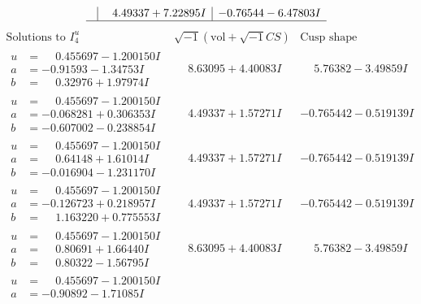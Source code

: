 \documentclass[1p]{elsarticle_modified}
\theoremstyle{definition}
\newcommand{\I}{\sqrt{-1}}
\begin{document}
$$\begin{array}{c|c|c}
 & \phantom{-}4.49337 + 7.22895 I & -0.76544 - 6.47803 I\\
 \hline 
 \end{array}$$\newpage$$\begin{array}{c|c|c}  
\text{Solutions to }I^u_{4}& \I (\text{vol} + \sqrt{-1}CS) & \text{Cusp shape}\\
 \hline 
\begin{aligned}
u &= \phantom{-}0.455697 - 1.200150 I \\
a &= -0.91593 - 1.34753 I \\
b &= \phantom{-}0.32976 + 1.97974 I\end{aligned}
 & \phantom{-}8.63095 + 4.40083 I & \phantom{-}5.76382 - 3.49859 I \\ \hline\begin{aligned}
u &= \phantom{-}0.455697 - 1.200150 I \\
a &= -0.068281 + 0.306353 I \\
b &= -0.607002 - 0.238854 I\end{aligned}
 & \phantom{-}4.49337 + 1.57271 I & -0.765442 - 0.519139 I \\ \hline\begin{aligned}
u &= \phantom{-}0.455697 - 1.200150 I \\
a &= \phantom{-}0.64148 + 1.61014 I \\
b &= -0.016904 - 1.231170 I\end{aligned}
 & \phantom{-}4.49337 + 1.57271 I & -0.765442 - 0.519139 I \\ \hline\begin{aligned}
u &= \phantom{-}0.455697 - 1.200150 I \\
a &= -0.126723 + 0.218957 I \\
b &= \phantom{-}1.163220 + 0.775553 I\end{aligned}
 & \phantom{-}4.49337 + 1.57271 I & -0.765442 - 0.519139 I \\ \hline\begin{aligned}
u &= \phantom{-}0.455697 - 1.200150 I \\
a &= \phantom{-}0.80691 + 1.66440 I \\
b &= \phantom{-}0.80322 - 1.56795 I\end{aligned}
 & \phantom{-}8.63095 + 4.40083 I & \phantom{-}5.76382 - 3.49859 I \\ \hline\begin{aligned}
u &= \phantom{-}0.455697 - 1.200150 I \\
a &= -0.90892 - 1.71085 I \\

\end{aligned}
\end{array}$$
\end{document}
